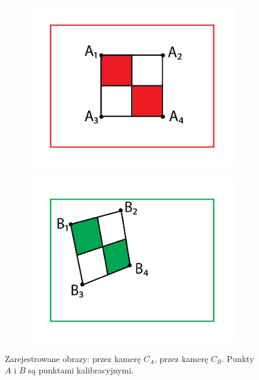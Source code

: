 \begin{figure}[h]
\centering
\begin{subfigure}{0.30\textwidth}
\centering
\includegraphics[width=1\textwidth]{images/camAimage}
\subcaption{\label{fig:camAimage}}
\end{subfigure}
\begin{subfigure}{0.30\textwidth}
\centering
\includegraphics[width=1\textwidth]{images/camBimage}
\subcaption{\label{fig:camBimage}}
\end{subfigure}
\caption{\label{fig:camImages}Zarejestrowane obrazy: \protect{} przez kamerę $C_A$, \protect{} przez kamerę $C_B$. Punkty $A$ i $B$ są punktami kalibracyjnymi.}
\end{figure}

